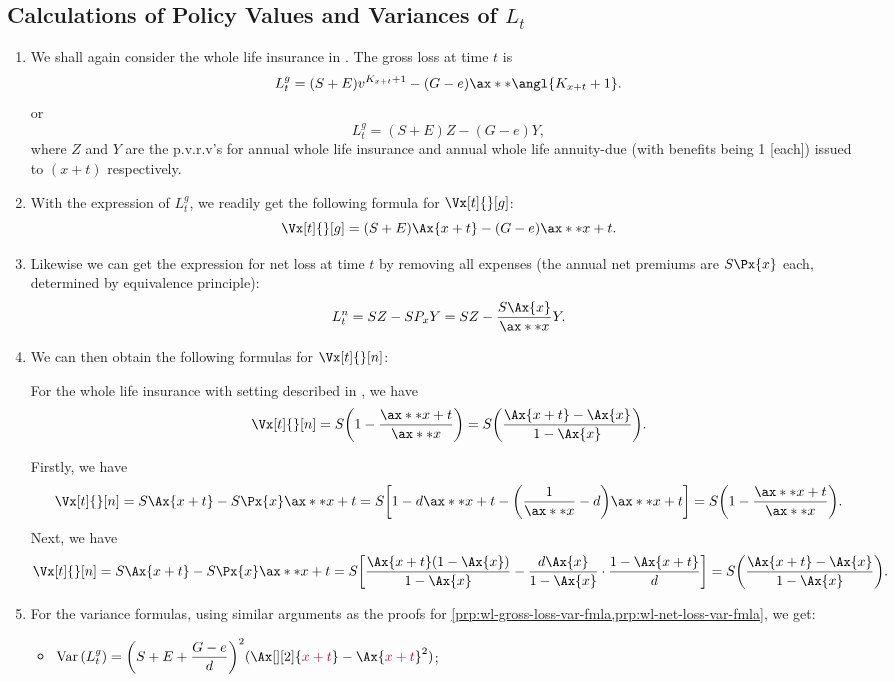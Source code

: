 \subsection{Calculations of Policy Values and Variances of \(L_t\)}
\begin{enumerate}
\item We shall again consider the whole life insurance in
. The gross loss at time \(t\) is
\[
L_t^g=(S+E)v^{K_{x+t}+1}-(G-e)\ax**{\angl{K_{x+t}+1}}.
\]
or
\[
L_t^g=(S+E)Z-(G-e)Y,
\]
where \(Z\) and \(Y\) are the p.v.r.v's for annual whole life insurance and
annual whole life annuity-due (with benefits being 1 [each]) issued to
\((x+t)\) respectively.

\item \label{it:wl-gross-pv-fmla}
With the expression of \(L_t^g\), we readily get the following formula
for \(\Vx[t]{}[g]\):
\[
\Vx[t]{}[g]=(S+E)\Ax{x+t}-(G-e)\ax**{x+t}.
\]

\item Likewise we can get the expression for net loss at time \(t\) by removing
all expenses (the annual net premiums are \(S\Px{x}\) each, determined by
equivalence principle):
\[
L_t^n=SZ-SP_xY=SZ-\frac{S\Ax{x}}{\ax**{x}}Y.
\]

\item
We can then obtain the following formulas for \(\Vx[t]{}[n]\):
\begin{proposition}
\label{prp:wl-net-pv-fmlas}
For the whole life insurance with setting described in
, we have
\[
\Vx[t]{}[n]=S\qty(1-\frac{\ax**{x+t}}{\ax**{x}})
=S\qty(\frac{\Ax{x+t}-\Ax{x}}{1-\Ax{x}}).
\]
\end{proposition}
\begin{pf}
Firstly, we have
\[
\Vx[t]{}[n]=S\Ax{x+t}-S\Px{x}\ax**{x+t}
=S\qty[1-d\ax**{x+t}-\qty(\frac{1}{\ax**{x}}-d)\ax**{x+t}]
=S\qty(1-\frac{\ax**{x+t}}{\ax**{x}}).
\]
Next, we have
\[
\Vx[t]{}[n]
=S\Ax{x+t}-S\Px{x}\ax**{x+t}
=S\qty[\frac{\Ax{x+t}(1-\Ax{x})}{1-\Ax{x}}-\frac{d\Ax{x}}{1-\Ax{x}}\cdot\frac{1-\Ax{x+t}}{d}]
=S\qty(\frac{\Ax{x+t}-\Ax{x}}{1-\Ax{x}}).
\]
\end{pf}

\item \label{it:loss-at-t-var-fmlas}
For the variance formulas, using similar arguments as the proofs for
\cref{prp:wl-gross-loss-var-fmla,prp:wl-net-loss-var-fmla}, we get:
\begin{itemize}
\item \(\displaystyle\vari{L_t^g}=\qty(S+E+\frac{G-e}{d})^{2}(\Ax[][2]{{\color{purple}x+t}}-\Ax{{\color{purple}x+t}}^2)\);


\end{itemize}
\end{enumerate}
